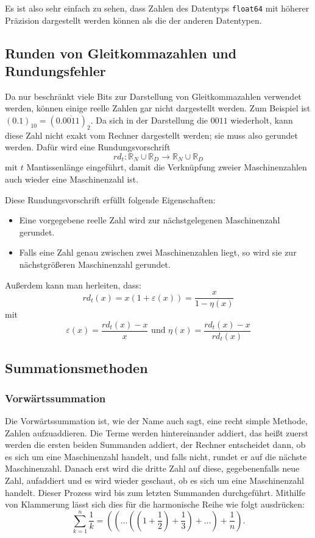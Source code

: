 \documentclass{scrartcl}
\begin{document}
Es ist also sehr einfach zu sehen, dass Zahlen des Datentyps \texttt{float64}
mit höherer Präzision dargestellt werden können als die der anderen Datentypen.

\subsection{Runden von Gleitkommazahlen und Rundungsfehler}
Da nur beschränkt viele Bits zur Darstellung von Gleitkommazahlen verwendet
werden, können einige reelle Zahlen gar nicht dargestellt werden.
Zum Beispiel ist \( (0.1)_{10} = (0.
\overline{0011})_2 \).
Da sich in der Darstellung die \(0011\) wiederholt, kann diese Zahl nicht exakt
vom Rechner dargestellt werden; sie muss also gerundet werden.
Dafür wird eine Rundungsvorschrift
\begin{equation*}
    rd_t: \mathbb{R}_N \cup \mathbb{R}_D \rightarrow \mathbb{R}_N \cup \mathbb{R}_D
\end{equation*}
mit \(t\) Mantissenlänge eingeführt, damit die Verknüpfung zweier Maschinenzahlen auch wieder eine
Maschinenzahl ist.

Diese Rundungsvorschrift erfüllt folgende Eigenschaften:
\begin{itemize}
    \item Eine vorgegebene reelle Zahl wird zur nächstgelegenen Maschinenzahl gerundet.
    \item Falls eine Zahl genau zwischen zwei Maschinenzahlen liegt, so wird sie zur nächstgrößeren Maschinenzahl gerundet.
\end{itemize}

Außerdem kann man herleiten, dass: \[ rd_t(x) = x(1+\varepsilon(x)) =
    \frac{x}{1-\eta(x)} \] mit \[ \varepsilon(x) = \frac{rd_t(x) - x}{x} \text{ und
    } \eta(x) = \frac{rd_t(x) - x}{rd_t(x)} \]

\subsection{Summationsmethoden} \subsubsection{Vorwärtssummation} Die
Vorwärtssummation ist, wie der Name auch sagt, eine recht simple Methode,
Zahlen aufzuaddieren.
Die Terme werden hintereinander addiert, das heißt zuerst werden die ersten
beiden Summanden addiert, der Rechner entscheidet dann, ob es sich um eine
Maschinenzahl handelt, und falls nicht, rundet er auf die nächste
Maschinenzahl.
Danach erst wird die dritte Zahl auf diese, gegebenenfalls neue Zahl,
aufaddiert und es wird wieder geschaut, ob es sich um eine Maschinenzahl
handelt.
Dieser Prozess wird bis zum letzten Summanden durchgeführt.
Mithilfe von Klammerung lässt sich dies für die harmonische Reihe wie folgt
ausdrücken:
\begin{equation*}
    \sum_{k=1}^{n} \frac{1}{k} = ((\ldots((1 + \frac{1}{2}) + \frac{1}{3}) + \ldots) + \frac{1}{n}).
\end{equation*}
\end{document}
